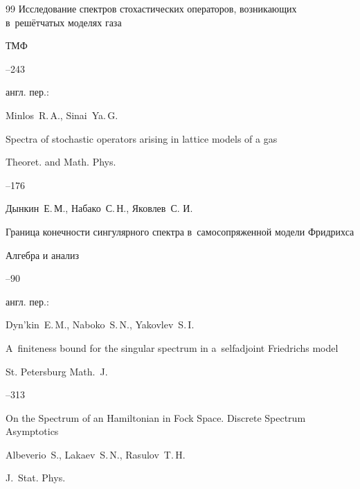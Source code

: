 \begin{thebibliography}{99}
\paper Исследование спектров стохастических операторов, возникающих в~решётчатых моделях газа

\jour ТМФ




--243

\transl англ. пер.:~

\by Minlos~R.\,A.,  Sinai~Ya.\,G.

\paper Spectra of stochastic operators arising in lattice models of a gas

\jour Theoret. and Math. Phys.




--176








\by Дынкин~Е.\,М., Набако~С.\,Н., Яковлев~С. И.

\paper Граница конечности сингулярного спектра в~самосопряженной модели Фридрихса

\jour Алгебра и анализ




--90

\transl англ. пер.:~

\by Dyn'kin~E.\,M., Naboko~S.\,N., Yakovlev~S.\,I.

\paper A~finiteness bound for the singular spectrum in a~selfadjoint Friedrichs model

\jour St. Petersburg Math.~J.




--313








\paper On the Spectrum of an Hamiltonian in Fock Space. Discrete Spectrum Asymptotics

\by Albeverio~S., Lakaev~S.\,N., Rasulov~T.\,H.

\jour J.~Stat. Phys.


\end{thebibliography}
